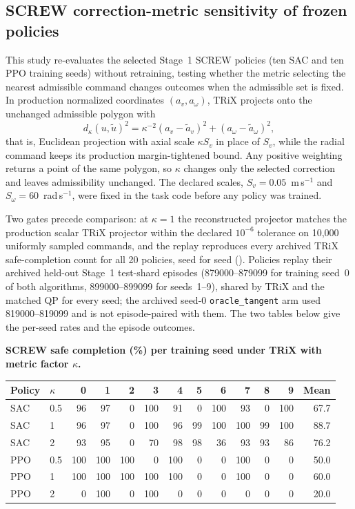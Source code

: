 \documentclass[10pt]{article}
\begin{document}
\subsection{SCREW correction-metric sensitivity of frozen policies}
This study re-evaluates the selected Stage~1 SCREW
policies (ten SAC and ten PPO training seeds) without retraining, testing
whether the metric selecting the nearest admissible command changes outcomes
when the admissible set is fixed. In production normalized coordinates
$(a_v,a_\omega)$, TRiX projects onto the unchanged admissible polygon with
\[
d_\kappa(u,\tilde u)^2=\kappa^{-2}(a_v-\tilde a_v)^2+(a_\omega-\tilde a_\omega)^2,
\]
that is, Euclidean projection with axial scale $\kappa S_v$ in place of $S_v$,
while the radial command keeps its production margin-tightened bound. Any
positive weighting returns a point of the same polygon, so $\kappa$ changes only the selected correction and leaves admissibility unchanged. The declared scales,
$S_v=0.05$~m\,s$^{-1}$ and $S_\omega=60$~rad\,s$^{-1}$, were fixed in
the task code before any policy was trained.

Two gates precede comparison: at $\kappa=1$ the reconstructed projector
matches the production scalar TRiX projector within the declared $10^{-6}$
tolerance on 10,000 uniformly sampled commands, and the replay reproduces
every archived TRiX safe-completion count for all 20 policies, seed for seed
().
Policies replay their archived held-out Stage~1 test-shard episodes
(879000--879099 for training seed~0 of both algorithms, 899000--899099 for
seeds~1--9), shared by TRiX and the matched QP for every seed; the archived
seed-0 \texttt{oracle\_tangent} arm used 819000--819099 and is not
episode-paired with them. The two tables below give the per-seed rates and the episode outcomes.

\par\noindent\begin{minipage}{\linewidth}\begin{center}
\small
\textbf{SCREW safe completion (\%) per training seed under TRiX with metric factor $\kappa$.}\\[4pt]
\setlength{\tabcolsep}{6pt}
\begin{tabular}{@{}llrrrrrrrrrrr@{}}
\toprule
Policy & $\kappa$ & 0 & 1 & 2 & 3 & 4 & 5 & 6 & 7 & 8 & 9 & Mean\\
\midrule
SAC & 0.5 & 96 & 97 & 0 & 100 & 91 & 0 & 100 & 93 & 0 & 100 & 67.7\\
SAC & 1 & 96 & 97 & 0 & 100 & 96 & 99 & 100 & 100 & 99 & 100 & 88.7\\
SAC & 2 & 93 & 95 & 0 & 70 & 98 & 98 & 36 & 93 & 93 & 86 & 76.2\\
\addlinespace
PPO & 0.5 & 100 & 100 & 100 & 0 & 100 & 0 & 0 & 100 & 0 & 0 & 50.0\\
PPO & 1 & 100 & 100 & 100 & 100 & 100 & 0 & 0 & 100 & 0 & 0 & 60.0\\
PPO & 2 & 0 & 100 & 0 & 100 & 0 & 0 & 0 & 0 & 0 & 0 & 20.0\\
\bottomrule
\end{tabular}
\end{center}\end{minipage}\par
\end{document}
